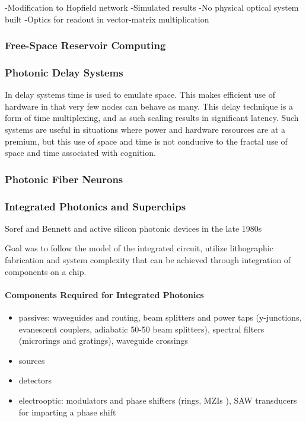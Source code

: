 \vspace{3em}
\cite{maar1987}
-Modification to Hopfield network
-Simulated results
-No physical optical system built
-Optics for readout in vector-matrix multiplication

\subsubsection{Free-Space Reservoir Computing}

\subsubsection{Photonic Delay Systems}
In delay systems time is used to emulate space. This makes efficient use of hardware in that very few nodes can behave as many. This delay technique is a form of time multiplexing, and as such scaling results in significant latency. Such systems are useful in situations where power and hardware resources are at a premium, but this use of space and time is not conducive to the fractal use of space and time associated with cognition.

\subsubsection{Photonic Fiber Neurons}
 
\subsubsection{Integrated Photonics and Superchips}
Soref and Bennett and active silicon photonic devices in the late 1980s

\vspace{3em}
Goal was to follow the model of the integrated circuit, utilize lithographic fabrication and system complexity that can be achieved through integration of components on a chip. 

\paragraph{Components Required for Integrated Photonics}
\begin{itemize}
\item passives: waveguides and routing, beam splitters and power taps (y-junctions, evanescent couplers, adiabatic 50-50 beam splitters), spectral filters (microrings \cite{ra2007} and gratings), waveguide crossings
\item sources
\item detectors
\item electrooptic: modulators and phase shifters (rings, MZIs \cite{ohno1975}), SAW transducers for imparting a phase shift
\end{itemize}

